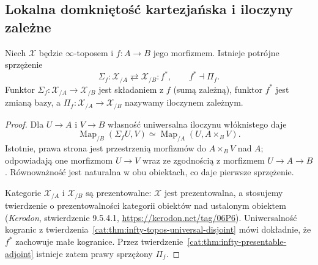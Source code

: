 \subsection{Lokalna domkniętość kartezjańska i iloczyny zależne}

\begin{twierdzenie}\label{cat:thm:infty-topos-dependent-products}
Niech $\mathcal X$ będzie $\infty$-toposem i $f:A\to B$ jego morfizmem. Istnieje potrójne sprzężenie
\[
 \Sigma_f:\mathcal X_{/A}\rightleftarrows\mathcal X_{/B}:f^*,
 \qquad f^*\dashv\Pi_f.
\]
Funktor $\Sigma_f:\mathcal X_{/A}\to\mathcal X_{/B}$ jest składaniem z $f$ (sumą zależną), funktor $f^*$ jest zmianą bazy, a $\Pi_f:\mathcal X_{/A}\to\mathcal X_{/B}$ nazywamy iloczynem zależnym.
\end{twierdzenie}
\begin{proof}
Dla $U\to A$ i $V\to B$ własność uniwersalna iloczynu włóknistego daje
\[
 \operatorname{Map}_{/B}(\Sigma_f U,V)
 \simeq\operatorname{Map}_{/A}(U,A\times_BV).
\]
Istotnie, prawa strona jest przestrzenią morfizmów do $A\times_BV$ nad $A$; odpowiadają one morfizmom $U\to V$ wraz ze zgodnością z morfizmem $U\to A\to B$. Równoważność jest naturalna w obu obiektach, co daje pierwsze sprzężenie.

Kategorie $\mathcal X_{/A}$ i $\mathcal X_{/B}$ są prezentowalne: $\mathcal X$ jest prezentowalna, a stosujemy twierdzenie o prezentowalności kategorii obiektów nad ustalonym obiektem (\emph{Kerodon}, stwierdzenie 9.5.4.1, \url{https://kerodon.net/tag/06P6}). Uniwersalność kogranic z twierdzenia~\ref{cat:thm:infty-topos-universal-disjoint} mówi dokładnie, że $f^*$ zachowuje małe kogranice. Przez twierdzenie~\ref{cat:thm:infty-presentable-adjoint} istnieje zatem prawy sprzężony $\Pi_f$.
\end{proof}

